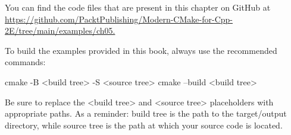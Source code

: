 You can find the code files that are present in this chapter on GitHub at \url{https://github.com/PacktPublishing/Modern-CMake-for-Cpp-2E/tree/main/examples/ch05.}

To build the examples provided in this book, always use the recommended commands:

\begin{shell}
cmake -B <build tree> -S <source tree>
cmake --build <build tree>
\end{shell}

Be sure to replace the <build tree> and <source tree> placeholders with appropriate paths. As a reminder: build tree is the path to the target/output directory, while source tree is the path at which your source code is located.








